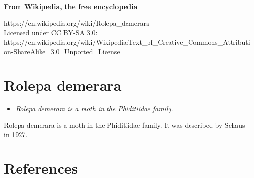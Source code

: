 \textbf{From Wikipedia, the free encyclopedia}

https://en.wikipedia.org/wiki/Rolepa\_demerara\\
Licensed under CC BY-SA 3.0:\\
https://en.wikipedia.org/wiki/Wikipedia:Text\_of\_Creative\_Commons\_Attribution-ShareAlike\_3.0\_Unported\_License

\section{Rolepa demerara}\label{rolepa-demerara}

\begin{itemize}
\item
  \emph{Rolepa demerara is a moth in the Phiditiidae family.}
\end{itemize}

Rolepa demerara is a moth in the Phiditiidae family. It was described by
Schaus in 1927.

\section{References}\label{references}

